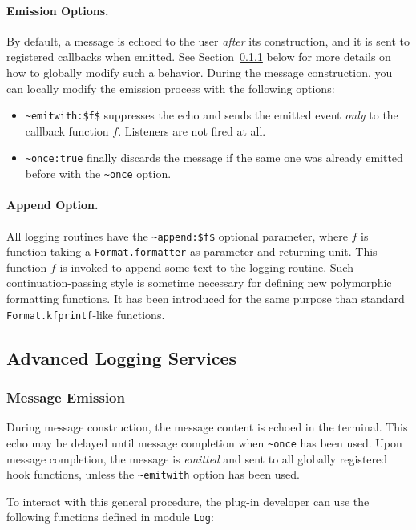 \paragraph{Emission Options.} By default, a message is echoed to the
user \emph{after} its construction, and it is sent to registered
callbacks when emitted. See Section~\ref{adv:log:events} below for
more details on how to globally modify such a behavior. During the
message construction, you can locally modify the emission process with
the following options:
\begin{itemize}
\item[] \lstinline{~emitwith:$f$} suppresses the echo and sends the
  emitted event \emph{only} to the callback function $f$. Listeners
  are not fired at all.
\item[] \lstinline{~once:true} finally discards the message if the
  same one was already emitted before with the \lstinline{~once}
  option.
\end{itemize}

\paragraph{Append Option.} All logging routines have the
\lstinline{~append:$f$} optional parameter, where $f$ is function
taking a \lstinline{Format.formatter} as parameter and returning
unit. This function $f$ is invoked to append some text to the logging
routine. Such continuation-passing style is sometime necessary for
defining new polymorphic formatting functions. It has been introduced
for the same purpose than standard \lstinline{Format.kfprintf}-like
functions.

\subsection{Advanced Logging Services}

\subsubsection{Message Emission}
\label{adv:log:events}

During message construction, the message content is echoed in the
terminal. This echo may be delayed until message completion when
\lstinline{~once} has been used. Upon message
completion, the message is \emph{emitted} and sent to all globally
registered hook functions, unless the
\lstinline{~emitwith} option has been used.

To interact with this general procedure, the plug-in developer can use
the following functions defined in module \texttt{Log}:

